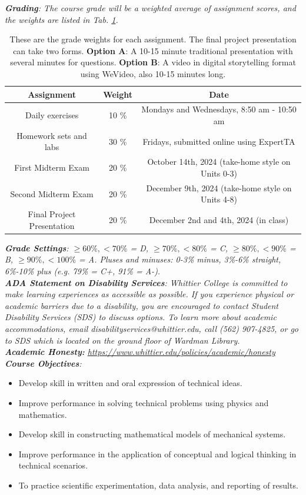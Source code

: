 \documentclass[10pt]{article}
\begin{document}
\textit{\textbf{Grading}: The course grade will be a weighted average of assignment scores, and the weights are listed in Tab. \ref{tab:grades}.}
\begin{table}
\centering
\begin{tabular}{| c | c | c |}
\hline
\textbf{Assignment} & \textbf{Weight} & \textbf{Date} \\ \hline
Daily exercises & 10 \% & Mondays and Wednesdays, 8:50 am - 10:50 am\\ \hline
Homework sets and labs & 30 \% & Fridays, submitted online using ExpertTA \\ \hline
First Midterm Exam & 20 \% & October 14th, 2024 (take-home style on Units 0-3) \\ \hline
Second Midterm Exam & 20 \% & December 9th, 2024 (take-home style on Units 4-8) \\ \hline
Final Project Presentation & 20 \% & December 2nd and 4th, 2024 (in class) \\ \hline
\end{tabular}
\caption{\label{tab:grades} These are the grade weights for each assignment. The final project presentation can take two forms.  \textbf{Option A}: A 10-15 minute traditional presentation with several minutes for questions.  \textbf{Option B}: A video in digital storytelling format using WeVideo, also 10-15 minutes long.}
\end{table}
\noindent
\textit{\textbf{Grade Settings}: $\geq 60\%, <70\%$ = D, $\geq 70\%, <80\%$ = C, $\geq 80\%, <90\%$ = B, $\geq 90\%, <100\%$ = A. Pluses and minuses: 0-3\% minus, 3\%-6\% straight, 6\%-10\% plus (e.g. 79\% = C+, 91\% = A-).} \\
\textit{\textbf{ADA Statement on Disability Services}: Whittier College is committed to make learning experiences as accessible as possible. If you experience physical or academic barriers due to a disability, you are encouraged to contact Student Disability Services (SDS) to discuss options. To learn more about academic accommodations, email disabilityservices@whittier.edu, call (562) 907-4825, or go to SDS which is located on the ground floor of Wardman Library.} \\
\textit{\textbf{Academic Honesty:} \url{https://www.whittier.edu/policies/academic/honesty}} \\
\noindent
\textit{\textbf{Course Objectives}:}
\begin{itemize}
\item Develop skill in written and oral expression of technical ideas.
\item Improve performance in solving technical problems using physics and mathematics.
\item Develop skill in constructing mathematical models of mechanical systems.
\item Improve performance in the application of conceptual and logical thinking in technical scenarios.
\item To practice scientific experimentation, data analysis, and reporting of results.
\end{itemize}
\end{document}
